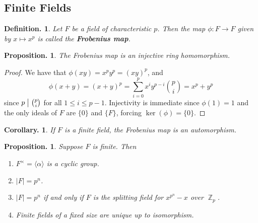 \documentclass[11pt, a4paper]{memoir}
\DeclareMathOperator{\Z}{{\mathbb{Z}}}
\newcommand{\mbf}[1]{{\boldmath\bfseries #1}}
\renewcommand{\div}{\bigm|}
\theoremstyle{change}
\newtheorem{corollary}[theorem]{Corollary.}
\newtheorem{proposition}[theorem]{Proposition.}
\theoremstyle{plain}
\theoremstyle{nonumberplain}
\newtheorem{definition}{Definition.}
\newtheorem{proof}{Proof}
\numberwithin{equation}{section}
\begin{document}
\subsection{Finite Fields}
\begin{definition}
    Let $F$ be a field of characteristic $p$.
    Then the map $\phi:F\to F$ given by $x\mapsto x^p$ is called the \mbf{Frobenius map}.
\end{definition}
\begin{proposition}
    The Frobenius map is an injective ring homomorphism.
\end{proposition}
\begin{proof}
    We have that $\phi(xy)=x^py^p=(xy)^p$, and
    \begin{equation*}
        \phi(x+y)=(x+y)^p=\sum_{i=0}^px^iy^{p-i}\binom{p}{i}=x^p+y^p
    \end{equation*}
    since $p\div\binom{p}{i}$ for all $1\leq i\leq p-1$.
    Injectivity is immediate since $\phi(1)=1$ and the only ideals of $F$ are $\{0\}$ and $\{F\}$, forcing $\ker(\phi)=\{0\}$.
\end{proof}
\begin{corollary}
    If $F$ is a finite field, the Frobenius map is an automorphism.
\end{corollary}
\begin{proposition}
    Suppose $F$ is finite.
    Then
    \begin{enumerate}[nolistsep]
        \item $F^\times=\langle \alpha\rangle$ is a cyclic group.
        \item $|F|=p^n$.
        \item $|F|=p^n$ if and only if $F$ is the splitting field for $x^{p^n}-x$ over $\Z_p$.
        \item Finite fields of a fixed size are unique up to isomorphism.
    \end{enumerate}
\end{proposition}
\end{document}
